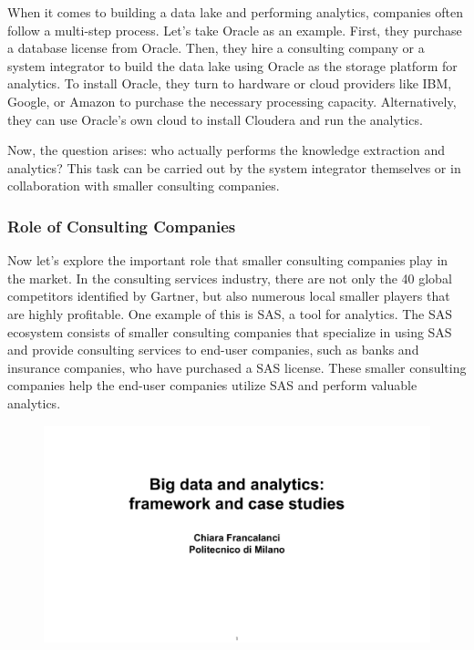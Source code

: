 When it comes to building a data lake and performing analytics,
companies often follow a multi-step process. Let's take Oracle as an
example. First, they purchase a database license from Oracle. Then, they
hire a consulting company or a system integrator to build the data lake
using Oracle as the storage platform for analytics. To install Oracle,
they turn to hardware or cloud providers like IBM, Google, or Amazon to
purchase the necessary processing capacity. Alternatively, they can use
Oracle's own cloud to install Cloudera and run the analytics.

Now, the question arises: who actually performs the knowledge extraction
and analytics? This task can be carried out by the system integrator
themselves or in collaboration with smaller consulting companies.

\subsubsection{Role of Consulting Companies}

Now let's explore the important role that smaller consulting companies
play in the market. In the consulting services industry, there are not
only the 40 global competitors identified by Gartner, but also numerous
local smaller players that are highly profitable. One example of this is
SAS, a tool for analytics. The SAS ecosystem consists of smaller
consulting companies that specialize in using SAS and provide consulting
services to end-user companies, such as banks and insurance companies,
who have purchased a SAS license. These smaller consulting companies
help the end-user companies utilize SAS and perform valuable analytics.

\begin{figure}[!h]
    \centering
    \includegraphics[page=61, trim = 1cm 3cm 1cm 4cm, clip, width=\textwidth]{images/06 - BIG_DATA.pdf}
\end{figure}

